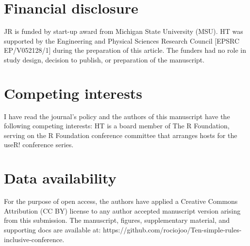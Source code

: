 \documentclass[10pt,letterpaper]{article}
\begin{document}
\section*{Financial disclosure}
JR is funded by start-up award from Michigan State University (MSU). HT was supported by the Engineering and Physical Sciences Research Council [EPSRC EP/V052128/1] during the preparation of this article.
The funders had no role in study design, decision to publish, or preparation of the manuscript.

\section*{Competing interests}
I have read the journal's policy and the authors of this manuscript have the following competing interests: HT is a board member of The R Foundation, serving on the R Foundation conference committee that arranges hosts for the useR! conference series.

\section*{Data availability}
For the purpose of open access, the authors have applied a Creative Commons Attribution (CC BY) license to any author accepted manuscript version arising from this submission. The manuscript, figures, supplementary material, and supporting docs are available at: https://github.com/rociojoo/Ten-simple-rules-inclusive-conference.


\end{document}
